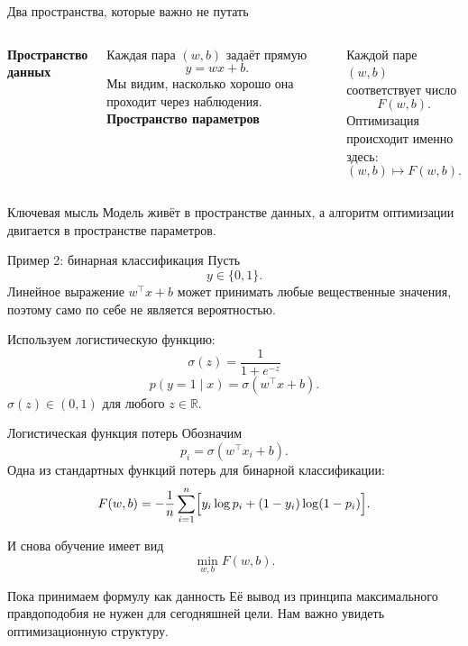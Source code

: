 \documentclass[aspectratio=169,10pt]{beamer}
\newcommand{\R}{\mathbb{R}}
\begin{document}
\begin{frame}{Два пространства, которые важно не путать}
\begin{columns}[T,onlytextwidth]
\textbf{Пространство данных}

Каждая пара $(w,b)$ задаёт прямую
\[
  y=wx+b.
\]
Мы видим, насколько хорошо она проходит через наблюдения.
\textbf{Пространство параметров}

Каждой паре $(w,b)$ соответствует число
\[
  F(w,b).
\]
Оптимизация происходит именно здесь:
\[
  (w,b)\longmapsto F(w,b).
\]
\end{columns}
\vspace{1.1em}
\begin{alertblock}{Ключевая мысль}
Модель живёт в пространстве данных, а алгоритм оптимизации двигается в пространстве параметров.
\end{alertblock}
\end{frame}

\begin{frame}{Пример 2: бинарная классификация}
Пусть
\[
  y\in\{0,1\}.
\]
Линейное выражение $w^\top x+b$ может принимать любые вещественные значения, поэтому само по себе не является вероятностью.

Используем логистическую функцию:
\[
  \boxed{
  \sigma(z)=\frac{1}{1+e^{-z}}
  }
\]
\[
  p(y=1\mid x)=\sigma(w^\top x+b).
\]
\vspace{0.4em}
\centering
$\sigma(z)\in(0,1)$ для любого $z\in\R$.
\end{frame}

\begin{frame}{Логистическая функция потерь}
Обозначим
\[
  p_i=\sigma(w^\top x_i+b).
\]
Одна из стандартных функций потерь для бинарной классификации:
\[
  F(w,b)=-\frac1n\sum_{i=1}^{n}
  \Bigl[y_i\log p_i+(1-y_i)\log(1-p_i)\Bigr].
\]

И снова обучение имеет вид
\[
  \boxed{\min_{w,b}F(w,b).}
\]

\begin{block}{Пока принимаем формулу как данность}
Её вывод из принципа максимального правдоподобия не нужен для сегодняшней цели. Нам важно увидеть оптимизационную структуру.
\end{block}
\end{frame}
\end{document}
